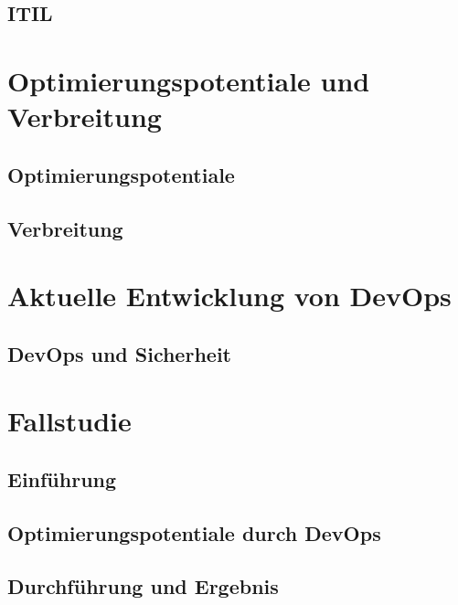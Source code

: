 \subsection{ITIL}


\section{Optimierungspotentiale und Verbreitung} %

\subsection{Optimierungspotentiale}

\subsection{Verbreitung}


\section{Aktuelle Entwicklung von DevOps} %

\subsection{DevOps und Sicherheit}


\section{Fallstudie} %

\subsection{Einführung}

\subsection{Optimierungspotentiale durch DevOps}

\subsection{Durchführung und Ergebnis}

